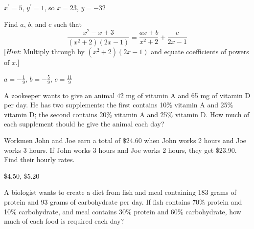 \begin{multicols}{2}
\begin{ex}
\begin{sol}
$x^\prime = 5$, $y^\prime = 1$, so $x = 23$, $y = -32$
\end{sol}
\end{ex}

\columnbreak
\begin{ex}
Find $a$, $b$, and $c$ such that
{\normalsize
\begin{equation*}
\frac{x^2 - x + 3}{(x^2 + 2)(2x - 1)} = \frac{ax + b}{x^2 + 2} + \frac{c}{2x - 1}
\end{equation*}}
[\textit{Hint}: Multiply through by $(x^2 + 2)(2x - 1)$ and equate coefficients of powers of $x$.]

\begin{sol}
$ a = -\frac{1}{9}$, $b = -\frac{5}{9}$, $c = \frac{11}{9}$
\end{sol}
\end{ex}

\begin{ex}
A zookeeper wants to give an animal 42 mg of vitamin A and 65 mg of vitamin D per day. He has two supplements: the first contains 10\% vitamin A and 25\% vitamin D; the second contains 20\% vitamin A and 25\% vitamin D. How much of each supplement should he give the animal each day?
\end{ex}

\begin{ex}
Workmen John and Joe earn a total of \$24.60 when John works 2 hours and Joe works 3 hours. If John works 3 hours and Joe works 2 hours, they get \$23.90. Find their hourly rates.

\begin{sol}
\$4.50, \$5.20
\end{sol}
\end{ex}

\begin{ex}
A biologist wants to create a diet from fish and meal containing 183 grams of protein and 93 grams of carbohydrate per day. If fish contains 70\% protein and 10\% carbohydrate, and meal contains 30\% protein and 60\% carbohydrate, how much of each food is required each day?
\end{ex}
\end{multicols}
